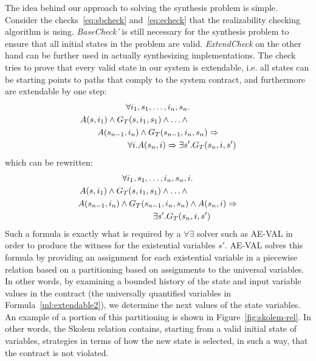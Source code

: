 The idea behind our approach to solving the synthesis problem is simple.
Consider the checks~\ref{eq:sbcheck} and~\ref{eq:echeck} that the realizability
checking algorithm is using. \textit{BaseCheck'} is still
necessary for the synthesis problem to ensure that all initial states in the problem are valid.
\textit{ExtendCheck} on the other hand can be further used in actually
synthesizing implementations. The check tries to prove that every valid state in
our system is extendable, i.e. all states can be starting points to paths that
comply to the system contract, and furthermore are extendable by one step:
	\begin{multline*}
		\forall i_1,s_1,\ldots,i_n,s_n. \\
		\hspace{-2cm} A(s,i_1) \wedge G_T(s,i_1,s_1) \wedge \ldots \wedge \\
		A(s_{n-1}, i_n) \wedge G_T(s_{n-1},i_n,s_n) \Rightarrow \\
		\hspace{+2cm} \forall i. A(s_n,i) \Rightarrow \exists s'. G_T(s_n,i,s')
	\end{multline*}
which can be rewritten:
	\begin{multline}
	\label{ml:extendable2}
		\forall i_1,s_1,\ldots,i_n,s_n,i. \\
		\hspace{-2cm} A(s,i_1) \wedge G_T(s,i_1,s_1) \wedge \ldots \wedge \\
		A(s_{n-1}, i_n) \wedge G_T(s_{n-1},i_n,s_n) \wedge A(s_n,i) \Rightarrow \\
		\hspace{+2cm} \exists s'. G_T(s_n,i,s')
	\end{multline}
Such a formula is exactly what is required by a $\forall\exists$
solver such as AE-VAL in order to produce the witness for the existential variables $s'$.
%
AE-VAL solves this formula by providing an assignment for each existential variable in a piecewise relation based on a partitioning based on assignments to the universal variables.  In other words, by examining a bounded history of the state and input variable values in the contract (the universally quantified variables in Formula~\ref{ml:extendable2}), we determine the next values of the state variables.  An example of a portion of this partitioning is shown in Figure~\ref{fig:skolem-rel}.
In other words, the Skolem relation contains, starting from a valid
initial state of variables, strategies in terms of how the new state is
selected, in such a way, that the contract is not violated.
\iffalse
This is particularly
interesting in our case since in the underlying machinery, each contract is
translated into an equivalent program in the Lustre specification language,
which explicitly defines expressions that dictate the way in which each variable
is expected to behave after a transition occurs to a new state. Therefore, a
final implementation is a simple Lustre program that--apart from the initial
state definitions--contains a set of expressions that depict the behavior of
each variable under a certain condition, in an equivalent manner to that
indicated by the Skolem relation.
\fi

